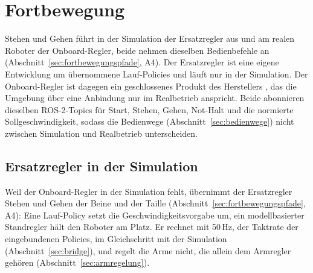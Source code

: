 
\section{Fortbewegung}
\label{sec:fortbewegung_umsetzung}
Stehen und Gehen führt in der Simulation der Ersatzregler aus und am realen Roboter der Onboard-Regler, beide nehmen dieselben Bedienbefehle an (Abschnitt~\ref{sec:fortbewegungspfade}, A4).
Der Ersatzregler ist eine eigene Entwicklung um übernommene Lauf-Policies und läuft nur in der Simulation.
Der Onboard-Regler ist dagegen ein geschlossenes Produkt des Herstellers \cite{Hu2026}, das die Umgebung über eine Anbindung nur im Realbetrieb anspricht.
Beide abonnieren dieselben ROS-2-Topics für Start, Stehen, Gehen, Not-Halt und die normierte Sollgeschwindigkeit, sodass die Bedienwege (Abschnitt~\ref{sec:bedienwege}) nicht zwischen Simulation und Realbetrieb unterscheiden.

\subsection{Ersatzregler in der Simulation}
\label{sec:ersatzregler}
Weil der Onboard-Regler in der Simulation fehlt, übernimmt der Ersatzregler Stehen und Gehen der Beine und der Taille (Abschnitt~\ref{sec:fortbewegungspfade}, A4): Eine Lauf-Policy setzt die Geschwindigkeitsvorgabe um, ein modellbasierter Standregler hält den Roboter am Platz.
Er rechnet mit 50\,Hz, der Taktrate der eingebundenen Policies, im Gleichschritt mit der Simulation (Abschnitt~\ref{sec:bridge}), und regelt die Arme nicht, die allein dem Armregler gehören (Abschnitt~\ref{sec:armregelung}).

